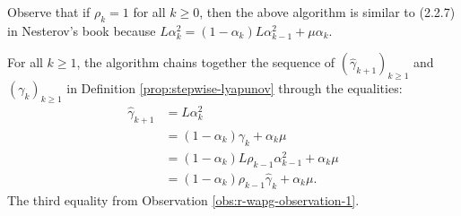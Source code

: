 \documentclass[12pt]{article}
\begin{document}
    \begin{observation}\label{obs:r-wapg-observation-2}
        Observe that if $\rho_k = 1$ for all $k\ge 0$, then the above algorithm is similar to (2.2.7) in Nesterov's book \cite{nesterov_lectures_2018} because $L\alpha_k^{2} = (1 - \alpha_k)L\alpha_{k - 1}^2 + \mu \alpha_k$. 
        \par
        For all $k \ge 1$, the algorithm chains together the sequence of $(\hat \gamma_{k+1})_{k \ge 1}$ and $(\gamma_k)_{k \ge 1}$ in Definition \ref{prop:stepwise-lyapunov} through the equalities: 
        \begin{align*}
            \hat \gamma_{k + 1} 
            &= L\alpha_k^2 
            \\
            &= (1 - \alpha_k)\gamma_k + \alpha_k \mu
            \\
            &= (1 - \alpha_k)L\rho_{k - 1}\alpha_{k - 1}^2 + \alpha_k \mu
            \\
            &= (1 - \alpha_k)\rho_{k - 1}\hat \gamma_{k} + \alpha_k \mu. 
        \end{align*}
        The third equality from Observation \ref{obs:r-wapg-observation-1}. 
    \end{observation}
    
\end{document}
